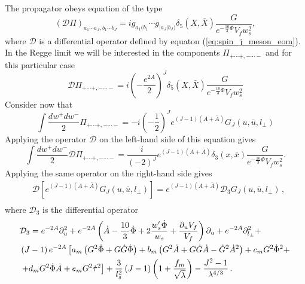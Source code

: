 \documentclass[a4paper,12pt]{article}
\begin{document}
The propagator obeys equation of the type
\begin{equation}
\left(\mathcal{D} \Pi\right)_{a_1 \cdots a_J, b_1 \cdots b_J} = i g_{a_1(b_1} \cdots g_{|a_J|b_J)} \delta_5 \left(X, \bar{X}\right) \frac{G}{e^{-\frac{10}{3}\Phi}V_f w_s^2},
\end{equation}
where $\mathcal{D}$ is a differential operator defined by equaton (\ref{eq:spin_j_meson_eom}).
In the Regge limit we will be interested in the components $\Pi_{+\cdots+,-\cdots-}$ and for this particular case
\begin{equation}
\mathcal{D} \Pi_{+\cdots+,-\cdots-} = i {\left( - \frac{e^{2A}}{2}\right)}^J  \delta_5 \left(X, \bar{X}\right) \frac{G}{e^{-\frac{10}{3}\Phi}V_f w_s^2}
\end{equation}
Consider now that
\begin{equation}
\int \frac{dw^+ dw^-}{2} \Pi_{+\cdots+, - \cdots -} = -i {\left(-\frac{1}{2}\right)}^J e^{\left(J-1\right)(A+\bar{A})} G_J \left(u, \bar{u}, l_\perp\right)
\end{equation}
Applying the operator $\mathcal{D}$ on the left-hand side of this equation gives
\begin{equation}
\int \frac{dw^+ dw^-}{2} \mathcal{D} \Pi_{+\cdots+, - \cdots -} = \frac{i}{{\left(-2\right)}^J} e^{\left(J-1\right)\left(A+\bar{A}\right)} \delta_3\left(x, \bar{x}\right) \frac{G}{e^{-\frac{10}{3}\Phi}V_f w_s^2}.
\end{equation}
Applying the same operator on the right-hand side gives
\begin{align}
&\mathcal{D} \left[ e^{\left(J-1\right) \left(A+\bar{A}\right)} G_J \left(u, \bar{u}, l_\perp\right) \right] = e^{\left(J-1\right)\left(A+\bar{A}\right)} \mathcal{D}_3 G_J \left(u, \bar{u}, l_\perp\right) \, , \\
\end{align}
where $\mathcal{D}_3$ is the differential operator
\begin{align}
&\mathcal{D}_3 = e^{-2A} \partial_u^2 + e^{-2A} \left( \dot{A} - \frac{10}{3} \dot{\Phi} + 2 \frac{w_s' \dot{\Phi}}{w_s} + \frac{\partial_u V_f}{V_f} \right) \partial_u + e^{-2A} \partial^2_{l_\perp} + \notag \\
& \left(J-1\right) e^{-2A} \left[ a_m \left(G^2\ddot{\Phi} + G \dot{G} \dot{\Phi} \right) + b_m \left(G^2 \ddot{A} + G \dot{G} \dot{A} - \dot{G}^2 {\dot{A}}^2\right) + c_m G^2 {\dot{\Phi}}^2  + \right. \notag \\
& \left. + d_m  G^2 \dot{\Phi} \dot{A} + e_m G^2 {\dot{\tau}}^2 \right] + \frac{3}{l_s^2} \left(J-1\right)\left(1+\frac{f_m}{\sqrt{\lambda}}\right) - \frac{J^2-1}{\lambda^{4/3}} \, .
\end{align}
\end{document}
